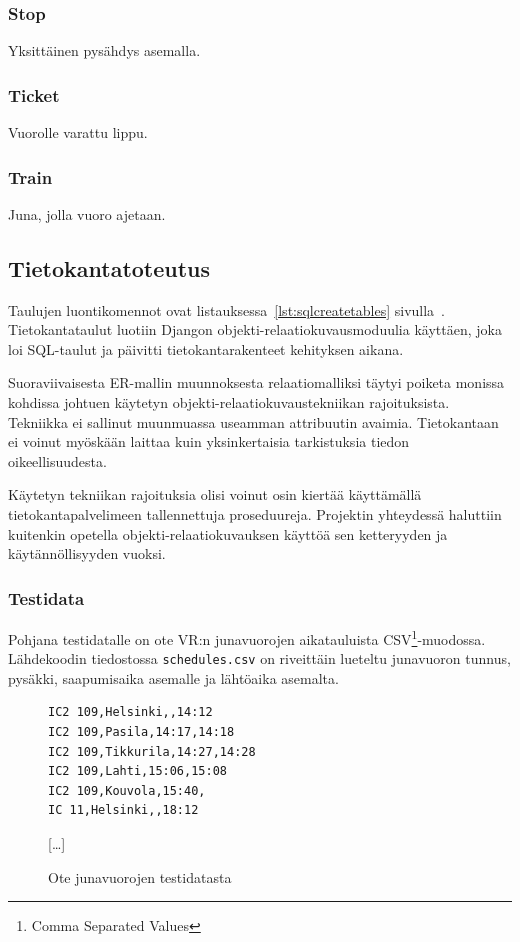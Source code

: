 \documentclass[a4paper,twoside,titlepage,12pt]{article}
\begin{document}
\subsubsection{Stop}

Yksittäinen pysähdys asemalla.

\subsubsection{Ticket}

Vuorolle varattu lippu.

\subsubsection{Train}

Juna, jolla vuoro ajetaan.

\subsection{Tietokantatoteutus}

Taulujen luontikomennot ovat listauksessa~\ref{lst:sqlcreatetables} sivulla~\pageref{lst:sqlcreatetables}. Tietokantataulut luotiin Djangon objekti-relaatiokuvausmoduulia käyttäen, joka loi SQL-taulut ja päivitti tietokantarakenteet kehityksen aikana.

Suoraviivaisesta ER-mallin muunnoksesta relaatiomalliksi täytyi poiketa monissa kohdissa johtuen käytetyn objekti-relaatiokuvaustekniikan rajoituksista. Tekniikka ei sallinut muunmuassa useamman attribuutin avaimia. Tietokantaan ei voinut myöskään laittaa kuin yksinkertaisia tarkistuksia tiedon oikeellisuudesta.


Käytetyn tekniikan rajoituksia olisi voinut osin kiertää käyttämällä tietokantapalvelimeen tallennettuja proseduureja. Projektin yhteydessä haluttiin kuitenkin opetella objekti-relaatiokuvauksen käyttöä sen ketteryyden ja käytännöllisyyden vuoksi.

\subsubsection{Testidata}

Pohjana testidatalle on ote VR:n junavuorojen aikatauluista CSV\footnote{Comma Separated Values}-muodossa. Lähdekoodin tiedostossa \texttt{schedules.csv} on riveittäin lueteltu junavuoron tunnus, pysäkki, saapumisaika asemalle ja lähtöaika asemalta.

\begin{figure}[h]
\begin{lstlisting}
IC2 109,Helsinki,,14:12
IC2 109,Pasila,14:17,14:18
IC2 109,Tikkurila,14:27,14:28
IC2 109,Lahti,15:06,15:08
IC2 109,Kouvola,15:40,
IC 11,Helsinki,,18:12
\end{lstlisting}
[\ldots]
  \caption{Ote junavuorojen testidatasta}
\end{figure}
\end{document}
